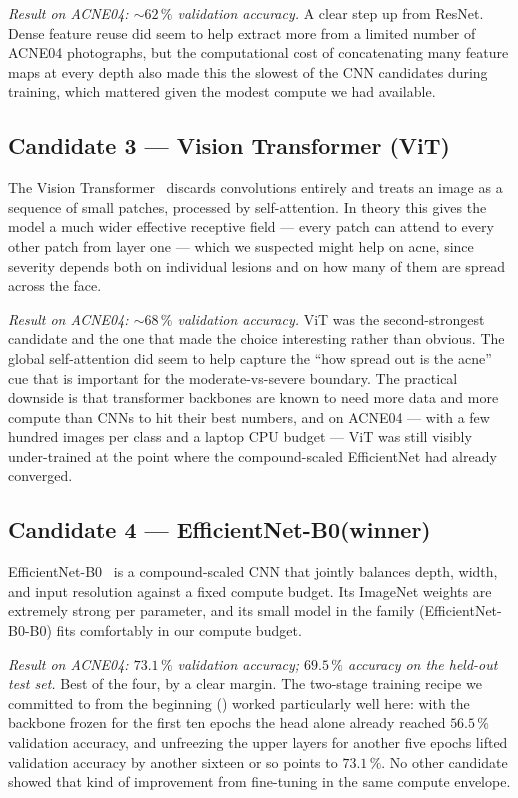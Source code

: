\documentclass[11pt,a4paper,oneside]{report}
\newcommand{\effnet}{EfficientNet-B0\xspace}
\begin{document}
\emph{Result on ACNE04: \(\sim 62\,\%\) validation accuracy.} A
clear step up from ResNet. Dense feature reuse did seem to help
extract more from a limited number of ACNE04 photographs, but the
computational cost of concatenating many feature maps at every
depth also made this the slowest of the CNN candidates during
training, which mattered given the modest compute we had
available.

\subsection{Candidate 3 --- Vision Transformer (ViT)}

The Vision Transformer~\cite{dosovitskiy2021vit} discards
convolutions entirely and treats an image as a sequence of small
patches, processed by self-attention. In theory this gives the
model a much wider effective receptive field --- every patch can
attend to every other patch from layer one --- which we suspected
might help on acne, since severity depends both on individual
lesions and on how many of them are spread across the face.

\emph{Result on ACNE04: \(\sim 68\,\%\) validation accuracy.} ViT
was the second-strongest candidate and the one that made the
choice interesting rather than obvious. The global self-attention
did seem to help capture the ``how spread out is the acne'' cue
that is important for the moderate-vs-severe boundary. The
practical downside is that transformer backbones are known to need
more data and more compute than CNNs to hit their best numbers,
and on ACNE04 --- with a few hundred images per class and a laptop
CPU budget --- ViT was still visibly under-trained at the point
where the compound-scaled EfficientNet had already converged.

\subsection{Candidate 4 --- \effnet (winner)}

\effnet~\cite{tan2019efficientnet} is a compound-scaled CNN that
jointly balances depth, width, and input resolution against a
fixed compute budget. Its ImageNet weights are extremely strong
per parameter, and its small model in the family (\effnet-B0)
fits comfortably in our compute budget.

\emph{Result on ACNE04: \(\mathbf{73.1\,\%}\) validation accuracy;
\(\mathbf{69.5\,\%}\) accuracy on the held-out test set.} Best of
the four, by a clear margin. The two-stage training recipe we
committed to from the beginning () worked
particularly well here: with the backbone frozen for the first ten
epochs the head alone already reached \(56.5\,\%\) validation
accuracy, and unfreezing the upper layers for another five epochs
lifted validation accuracy by another sixteen or so points to
\(73.1\,\%\). No other candidate showed that kind of improvement
from fine-tuning in the same compute envelope.
\end{document}
